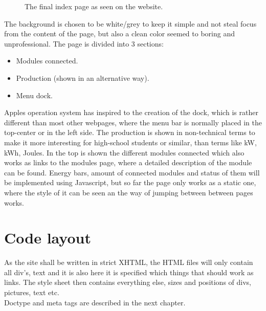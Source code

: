 \begin{figure}[h!]
	\center
		\setlength\fboxsep{0pt}
		\setlength\fboxrule{1pt}
   	\caption{The final index page as seen on the website.}
   	\label{fig:index_page_design}
\end{figure}
The background is chosen to be white/grey to keep it simple and not steal focus from the content of the page, but also a clean color seemed to boring and unprofessional. 
\newpage The page is divided into 3 sections:
\begin{itemize}
	\item Modules connected.
	\item Production (shown in an alternative way).
	\item Menu dock.
\end{itemize}
Apples operation system has inspired to the creation of the dock, which is rather different than most other webpages, where the menu bar is normally placed in the top-center or in the left side. The production is shown in non-technical terms to make it more interesting for high-school students or similar, than terms like kW, kWh, Joules. In the top is shown the different modules connected which also works as links to the modules page, where a detailed description of the module can be found. Energy bars, amount of connected modules and status of them will be implemented using Javascript, but so far the page only works as a static one, where the style of it can be seen an the way of jumping between between pages works.  
\section{Code layout}
As the site shall be written in strict XHTML, the HTML files will only contain all div's, text and it is also here it is specified which things that should work as links. The style sheet then contains everything else, sizes and positions of divs, pictures, text etc.
\\Doctype and meta tags are described in the next chapter.
